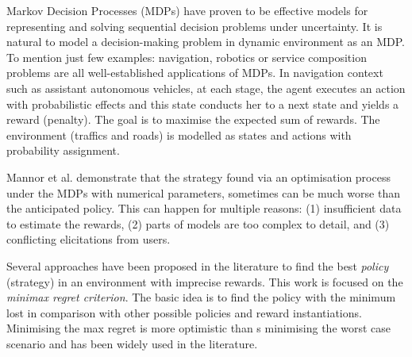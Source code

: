 \documentclass[sigconf]{aamas}  %
\begin{document}
Markov Decision Processes (MDPs) have proven to be effective models for representing and solving sequential decision problems under uncertainty. It is natural to model a decision-making problem in dynamic environment as an MDP. To mention just few examples: navigation, robotics or service composition problems are all well-established applications of MDPs. In navigation context such as assistant autonomous vehicles, at each stage, the agent executes an action with probabilistic effects and this state conducts her to a next state and yields a reward (penalty). The goal is to maximise the expected sum of rewards. The environment %
 (traffics and roads) is modelled as states and actions with probability assignment.%
 
 
Mannor et al.  demonstrate that the strategy found via an optimisation process under the MDPs with numerical parameters, sometimes can be much worse than the anticipated policy. This can happen for multiple reasons:
(1) insufficient data to estimate the rewards,
(2) parts of models are too complex to detail, %
and (3) conflicting elicitations from users. %

Several approaches have been proposed in the literature to find the best \textit{policy} (strategy) in an environment with imprecise rewards. This work is focused on the \textit{minimax regret criterion}. The basic idea is to find the policy with the minimum lost in comparison with other possible policies and reward instantiations. Minimising the max regret is more optimistic than s minimising the worst case scenario and has been widely used in the literature. %
\end{document}
